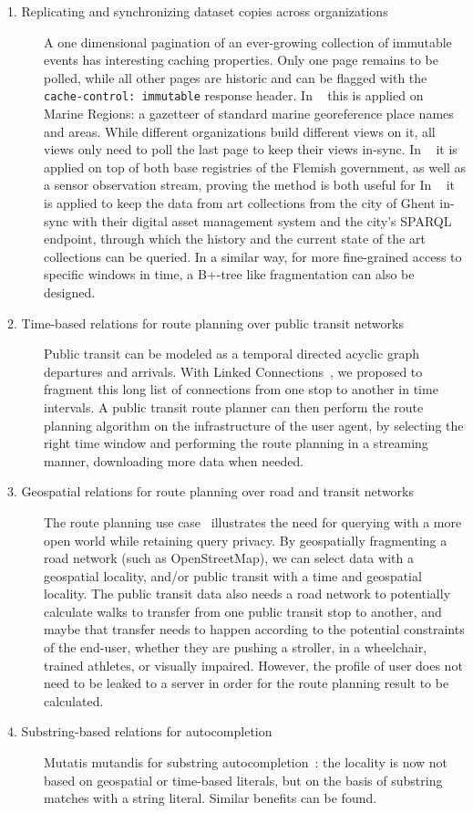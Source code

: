 \documentclass[
]{ceurart}
\begin{document}
\begin{description}
\item[1. Replicating and synchronizing dataset copies across organizations]
A one dimensional pagination of an ever-growing collection of immutable events has interesting caching properties.
Only one page remains to be polled, while all other pages are historic and can be flagged with the \texttt{cache-control: immutable} response header.
In ~\cite{lonneville2021publishing} this is applied on Marine Regions: a gazetteer of standard marine georeference place names and areas. While different organizations build different views on it, all views only need to poll the last page to keep their views in-sync.
In ~\cite{ldes} it is applied on top of both base registries of the Flemish government, as well as a sensor observation stream, proving the method is both useful for
In ~\cite{van2022publishing} it is applied to keep the data from art collections from the city of Ghent in-sync with their digital asset management system and the city’s SPARQL endpoint, through which the history and the current state of the art collections can be queried.
In a similar way, for more fine-grained access to specific windows in time, a B+-tree like fragmentation can also be designed.
 \item[2. Time-based relations for route planning over public transit networks]
Public transit can be modeled as a temporal directed acyclic graph departures and arrivals. With Linked Connections~\cite{rojas2022publishing}, we proposed to fragment this long list of connections from one stop to another in time intervals. A public transit route planner can then perform the route planning algorithm on the infrastructure of the user agent, by selecting the right time window and performing the route planning in a streaming manner, downloading more data when needed.
 \item[3. Geospatial relations for route planning over road and transit networks]
The route planning use case~\cite{delva2019client} illustrates the need for querying with a more open world while retaining query privacy.
By geospatially fragmenting a road network (such as OpenStreetMap), we can select data with a geospatial locality, and/or public transit with a time and geospatial locality.
The public transit data also needs a road network to potentially calculate walks to transfer from one public transit stop to another, and maybe that transfer needs to happen according to the potential constraints of the end-user, whether they are pushing a stroller, in a wheelchair, trained athletes, or visually impaired. However, the profile of user does not need to be leaked to a server in order for the route planning result to be calculated.
 \item[4. Substring-based relations for autocompletion]
Mutatis mutandis for substring autocompletion~\cite{dedecker2021file}: the locality is now not based on geospatial or time-based literals, but on the basis of substring matches with a string literal. Similar benefits can be found.
\end{description}
\end{document}
